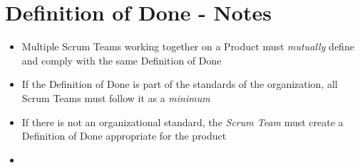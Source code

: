 \documentclass[a4paper,11pt,twocolumn]{article}
\begin{document}
\section*{Definition of Done - Notes}
\begin{itemize}
	\item Multiple Scrum Teams working together on a Product must \textit{mutually} define and comply with the same Definition of Done
	\item If the Definition of Done is part of the standards of the organization, all Scrum Teams must follow it as a \textit{minimum}
	\item If there is not an organizational standard, the \textit{Scrum Team} must create a Definition of Done appropriate for the product
	\item 
\end{itemize}

\nocite{*}


\end{document}
